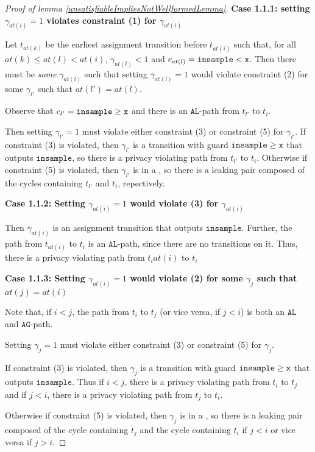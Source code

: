 \begin{proof}[Proof of lemma \ref{unsatisfiableImpliesNotWellformedLemma}]
    \textbf{Case 1.1.1: setting $\gamma_{at(i)} = 1$ violates constraint (1) for $\gamma_{at(i)}$}

    Let $t_{at(k)}$ be the earliest assignment transition before $t_{at(i)}$ such that, for all $at(k)\leq at(l)< at(i)$, $\gamma_{at(l)} <1$ and $c_{at(l)} = \lguard[\texttt{x}]$. Then there must be \textit{some} $\gamma_{at(l)}$ such that setting $\gamma_{at(l)} = 1$ would violate constraint (2) for some $\gamma_{l'}$ such that $at(l') = at(l)$. 

    Observe that $c_{l'} = \gguard[\texttt{x}]$ and there is an $\texttt{AL}$-path from $t_{l'}$ to $t_i$. 

    Then setting $\gamma_{l'}= 1$ must violate either constraint (3) or constraint (5) for $\gamma_{l'}$. If constraint (3) is violated, then $\gamma_{l'}$ is a transition with guard $\gguard[\texttt{x}]$ that outputs $\texttt{insample}$, so there is a privacy violating path from $t_{l'}$ to $t_i$. Otherwise if constraint (5) is violated, then $\gamma_{l'}$ is in a \gcycle, so there is a leaking pair composed of the cycles containing $t_{l'}$ and $t_i$, repectively. 

    \textbf{Case 1.1.2: Setting $\gamma_{at(i)}=1$ would violate (3) for $\gamma_{at(i)}$}

    Then $\gamma_{at(i)}$ is an assignment transition that outputs $\texttt{insample}$. Further, the path from $t_{at(i)}$ to $t_i$ is an $\texttt{AL}$-path, since there are no transitions on it. Thus, there is a privacy violating path from $t_i{at(i)}$ to $t_i$

    \textbf{Case 1.1.3: Setting $\gamma_{at(i)}=1$ would violate (2) for some $\gamma_j$ such that $at(j)= at(i)$}

    Note that, if $i<j$, the path from $t_i$ to $t_j$ (or vice versa, if $j<i$) is both an $\texttt{AL}$ and $\texttt{AG}$-path.

    Setting $\gamma_{j}= 1$ must violate either constraint (3) or constraint (5) for $\gamma_{j}$. 
    
    If constraint (3) is violated, then $\gamma_{j}$ is a transition with guard $\gguard[\texttt{x}]$ that outputs $\texttt{insample}$. Thus if $i<j$, there is a privacy violating path from $t_i$ to $t_j$ and if $j<i$, there is a privacy violating path from $t_j$ to $t_i$. 
    
    Otherwise if constraint (5) is violated, then $\gamma_{j}$ is in a \gcycle, so there is a leaking pair composed of the cycle containing $t_j$ and the cycle containing $t_i$ if $j<i$ or vice versa if $j>i$. 


\end{proof}
